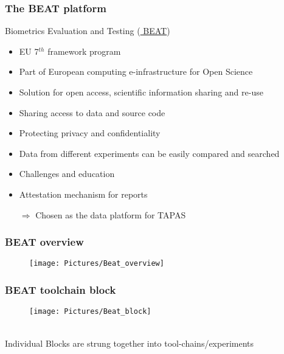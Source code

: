 \documentclass[xcolor=dvipsnames]{beamer}
\begin{document}
\begin{frame}
	\frametitle{The BEAT platform \hspace{7cm} {\scriptsize\cite{anjos2017beat}}}
	
	\begin{block}{Biometrics Evaluation and Testing (\href{https://www.beat-eu.org/platform/}{\color{blue} BEAT}) \hspace{4cm} {\scriptsize\cite{BEATweb}}}
	\begin{itemize}
	\item EU 7$^{th}$ framework program
	\item Part of European computing e-infrastructure for Open Science
	\item Solution for open access, scientific information sharing and re-use
	\item Sharing access to data and source code
	\item Protecting privacy and confidentiality
	\item Data from different experiments can be easily compared and searched
	\item Challenges and education
	\item Attestation mechanism for reports
	\item[$\Rightarrow$] {\color{Maroon}Chosen as the data platform for TAPAS}
	\end{itemize}
	\end{block}	
	
	
	\let\thefootnote\relax{}
\end{frame}

\begin{frame}
	\frametitle{BEAT overview}
		
	\begin{center}
	\begin{figure}[l]
     \texttt{[image: Pictures/Beat\_overview]}
	\end{figure}
	\end{center}
\end{frame}


\begin{frame}
	\frametitle{BEAT toolchain block}
		
	\begin{center}
	\begin{figure}[l]
     \texttt{[image: Pictures/Beat\_block]}
	\end{figure}
	~\\
	Individual Blocks are strung together into tool-chains/experiments
	\end{center}
\end{frame}
\end{document}

